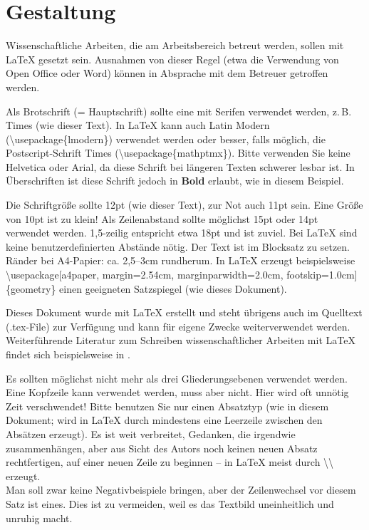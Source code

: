 \documentclass[
    fontsize=12pt,
    headings=small,
    parskip=half,           %
    bibliography=totoc,
    numbers=noenddot,       %
    open=any,               %
    ]{scrreprt}
\begin{document}
\section{Gestaltung}

Wissenschaftliche Arbeiten, die am Arbeitsbereich betreut werden, sollen mit LaTeX gesetzt sein. Ausnahmen von dieser Regel (etwa die Verwendung von Open Office oder Word) können in Absprache mit dem Betreuer getroffen werden.

Als Brotschrift (= Hauptschrift) sollte eine mit Serifen verwendet werden, z.\,B. Times (wie dieser Text). In LaTeX kann auch Latin Modern (\textbackslash usepackage\{lmodern\}) verwendet werden oder besser, falls möglich, die Postscript-Schrift Times (\textbackslash usepackage\{mathptmx\}). Bitte verwenden Sie keine \textsf{Helvetica} oder \textsf{Arial}, da diese Schrift bei längeren Texten schwerer lesbar ist. In Überschriften ist diese Schrift jedoch in \textsf{\textbf{Bold}} erlaubt, wie in diesem Beispiel.

Die Schriftgröße sollte 12pt (wie dieser Text), zur Not auch 11pt sein. Eine Größe von 10pt ist zu klein! Als Zeilenabstand sollte möglichst 15pt oder 14pt verwendet werden. 1,5-zeilig entspricht etwa 18pt und ist zuviel. Bei LaTeX sind keine benutzerdefinierten Abstände nötig. Der Text ist im Blocksatz zu setzen. Ränder bei A4-Papier: ca. 2,5--3cm rundherum. In LaTeX erzeugt beispielsweise \textbackslash usepackage[a4paper, margin=2.54cm, marginparwidth=2.0cm, footskip=1.0cm]\{geometry\} einen geeigneten Satzspiegel (wie dieses Dokument).

Dieses Dokument wurde mit LaTeX erstellt und steht übrigens auch im Quelltext (.tex-File) zur Verfügung und kann für eigene Zwecke weiterverwendet werden. Weiterführende Literatur zum Schreiben wissenschaftlicher Arbeiten mit LaTeX findet sich beispielsweise in \cite{Schl2013}.

Es sollten möglichst nicht mehr als drei Gliederungsebenen verwendet werden. Eine Kopfzeile kann verwendet werden, muss aber nicht. Hier wird oft unnötig Zeit verschwendet! Bitte benutzen Sie nur einen Absatztyp (wie in diesem Dokument; wird in LaTeX durch mindestens eine Leerzeile zwischen den Absätzen erzeugt). Es ist weit verbreitet, Gedanken, die irgendwie zusammenhängen, aber aus Sicht des Autors noch keinen neuen Absatz rechtfertigen, auf einer neuen Zeile zu beginnen -- in LaTeX meist durch {\textbackslash\textbackslash} erzeugt.\\ Man soll zwar keine Negativbeispiele bringen, aber der Zeilenwechsel vor diesem Satz ist eines. Dies ist zu vermeiden, weil es das Textbild uneinheitlich und unruhig macht.
\end{document}
